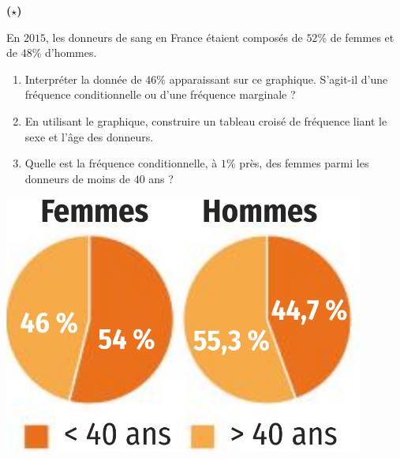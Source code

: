 \documentclass[11pt]{article}
\begin{document}
\begin{exo}\!\!\textbf{($\star$)}\\
\begin{minipage}[]{.5\textwidth}
  En $2015$, les donneurs de sang en France étaient composés de $52$\% de femmes
  et de $48$\% d'hommes.
  \begin{enumerate}
    \item Interpréter la donnée de $46$\% apparaissant sur ce graphique.
      S'agit-il d'une fréquence conditionnelle ou d'une fréquence marginale ?
    \item En utilisant le graphique, construire un tableau croisé de fréquence
      liant le sexe et l'\^age des donneurs.
    \item Quelle est la fréquence conditionnelle, à $1$\% près, des femmes parmi
      les donneurs de moins de $40$ ans ?
  \end{enumerate}
\end{minipage}
\begin{minipage}[]{.5\textwidth}
  \begin{center}
    \includegraphics[scale=.5]{hf.png}
  \end{center}
\end{minipage}
\end{exo}
\end{document}
